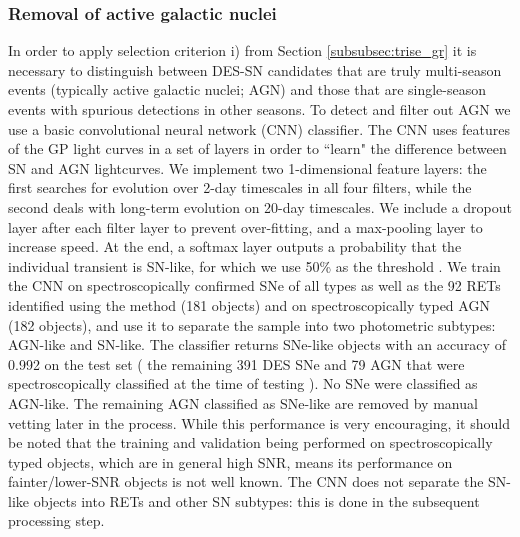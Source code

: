 \documentclass[fleqn,usenatbib,]{mnras}
\newcommand{\replyref}[1]{\color{magenta}#1 \color{black}}
\begin{document}
\subsubsection{Removal of active galactic nuclei \label{subsubsec:cnn}}

In order to apply selection criterion i) from Section \ref{subsubsec:trise_gr} it is necessary to distinguish between DES-SN candidates that are truly multi-season events (typically active galactic nuclei; AGN) and those that are single-season events with spurious detections in other seasons. 
To detect and filter out AGN we use a basic convolutional neural network (CNN) classifier. \replyref{The CNN uses features of the GP light curves in a set of layers in order to ``learn" the difference between SN and AGN lightcurves. We implement two 1-dimensional feature layers: the first searches for evolution over 2-day timescales in all four filters, while the second deals with long-term evolution on 20-day timescales. We include a dropout layer after each filter layer to prevent over-fitting, and a max-pooling layer to increase speed. At the end, a softmax layer outputs a probability that the individual transient is SN-like, for which we use 50\% as the threshold}.  We train the CNN on spectroscopically confirmed SNe of all types as well as the 92 RETs identified using the  method (181 objects) and on spectroscopically typed AGN (182 objects), and use it to separate the sample into two photometric subtypes: AGN-like and SN-like. The classifier returns SNe-like objects with an accuracy of 0.992 on the test set (\replyref{ the remaining 391 DES SNe and 79 AGN that were spectroscopically classified at the time of testing}). No SNe were classified as AGN-like. The remaining AGN classified as SNe-like are removed by manual vetting later in the process. \replyref{While this performance is very encouraging, it should be noted that the training and validation being performed on spectroscopically typed objects, which are in general high SNR, means its performance on fainter/lower-SNR objects is not well known.}  The CNN does not separate the SN-like objects into RETs and other SN subtypes: this is done in the subsequent processing step.
\end{document}
